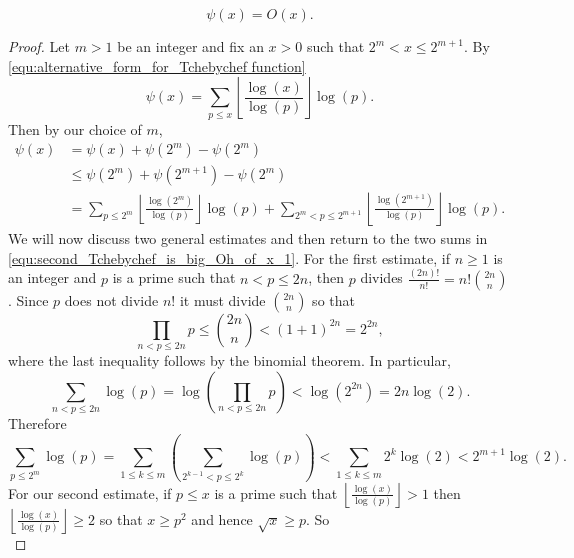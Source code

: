       \begin{proposition}\label{prop:second_Tchebychef_is_big_Oh_of_x}
        \phantom{ }
        \[
          \psi(x) = O(x).
        \]
      \end{proposition}
      \begin{proof}
        Let $m > 1$ be an integer and fix an $x > 0$ such that $2^{m} < x \le 2^{m+1}$. By \cref{equ:alternative_form_for_Tchebychef function}
        \[
          \psi(x) = \sum_{p \le x}\left\lfloor\frac{\log(x)}{\log(p)}\right\rfloor\log(p).
        \]
        Then by our choice of $m$,
        \begin{equation}\label{equ:second_Tchebychef_is_big_Oh_of_x_1}
          \begin{aligned}
            \psi(x) &= \psi(x)+\psi(2^{m})-\psi(2^{m}) \\
            &\le \psi(2^{m})+\psi(2^{m+1})-\psi(2^{m}) \\
            &= \sum_{p \le 2^{m}}\left\lfloor\frac{\log(2^{m})}{\log(p)}\right\rfloor\log(p)+\sum_{2^{m} < p \le 2^{m+1}}\left\lfloor\frac{\log(2^{m+1})}{\log(p)}\right\rfloor\log(p).
          \end{aligned}
        \end{equation}
        We will now discuss two general estimates and then return to the two sums in \cref{equ:second_Tchebychef_is_big_Oh_of_x_1}. For the first estimate, if $n \ge 1$ is an integer and $p$ is a prime such that $n < p \le 2n$, then $p$ divides $\frac{(2n)!}{n!} = n!\binom{2n}{n}$. Since $p$ does not divide $n!$ it must divide $\binom{2n}{n}$ so that
        \[
          \prod_{n < p \le 2n}p \le \binom{2n}{n} < (1+1)^{2n} = 2^{2n},
        \]
        where the last inequality follows by the binomial theorem. In particular,
        \[
          \sum_{n < p \le 2n}\log(p) = \log\left(\prod_{n < p \le 2n}p\right) < \log(2^{2n}) = 2n\log(2).
        \]
        Therefore
        \begin{equation}\label{equ:second_Tchebychef_is_big_Oh_of_x_2}
          \sum_{p \le 2^{m}}\log(p) = \sum_{1 \le k \le m}\left(\sum_{2^{k-1} < p \le 2^{k}}\log(p)\right) < \sum_{1 \le k \le m}2^{k}\log(2) < 2^{m+1}\log(2).
        \end{equation}
        For our second estimate, if $p \le x$ is a prime such that $\left\lfloor\frac{\log(x)}{\log(p)}\right\rfloor > 1$ then $\left\lfloor\frac{\log(x)}{\log(p)}\right\rfloor \ge 2$ so that $x \ge p^{2}$ and hence $\sqrt{x} \ge p$. So
        \begin{equation}\label{equ:second_Tchebychef_is_big_Oh_of_x_3}

\end{equation}
\end{proof}
